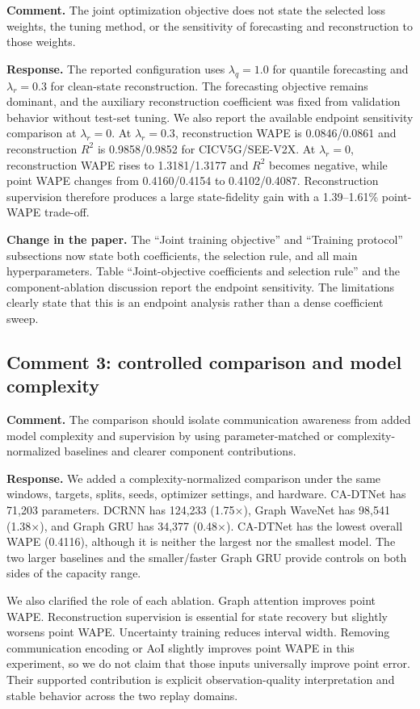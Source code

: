 \documentclass[11pt]{article}
\newcommand{\reviewcomment}[1]{\par\textcolor{commentblue}{\textbf{Comment.} #1}\par}
\newcommand{\authorresponse}[1]{\par\textcolor{responsegreen}{\textbf{Response.} #1}\par}
\newcommand{\paperchange}[1]{\par\textbf{Change in the paper.} #1\par}
\begin{document}
\reviewcomment{The joint optimization objective does not state the selected loss weights, the tuning method, or the sensitivity of forecasting and reconstruction to those weights.}

\authorresponse{The reported configuration uses $\lambda_q=1.0$ for quantile forecasting and $\lambda_r=0.3$ for clean-state reconstruction. The forecasting objective remains dominant, and the auxiliary reconstruction coefficient was fixed from validation behavior without test-set tuning. We also report the available endpoint sensitivity comparison at $\lambda_r=0$. At $\lambda_r=0.3$, reconstruction WAPE is 0.0846/0.0861 and reconstruction $R^2$ is 0.9858/0.9852 for CICV5G/SEE-V2X. At $\lambda_r=0$, reconstruction WAPE rises to 1.3181/1.3177 and $R^2$ becomes negative, while point WAPE changes from 0.4160/0.4154 to 0.4102/0.4087. Reconstruction supervision therefore produces a large state-fidelity gain with a 1.39--1.61\% point-WAPE trade-off.}

\paperchange{The ``Joint training objective'' and ``Training protocol'' subsections now state both coefficients, the selection rule, and all main hyperparameters. Table ``Joint-objective coefficients and selection rule'' and the component-ablation discussion report the endpoint sensitivity. The limitations clearly state that this is an endpoint analysis rather than a dense coefficient sweep.}

\subsection*{Comment 3: controlled comparison and model complexity}

\reviewcomment{The comparison should isolate communication awareness from added model complexity and supervision by using parameter-matched or complexity-normalized baselines and clearer component contributions.}

\authorresponse{We added a complexity-normalized comparison under the same windows, targets, splits, seeds, optimizer settings, and hardware. CA-DTNet has 71,203 parameters. DCRNN has 124,233 (1.75$\times$), Graph WaveNet has 98,541 (1.38$\times$), and Graph GRU has 34,377 (0.48$\times$). CA-DTNet has the lowest overall WAPE (0.4116), although it is neither the largest nor the smallest model. The two larger baselines and the smaller/faster Graph GRU provide controls on both sides of the capacity range.}

We also clarified the role of each ablation. Graph attention improves point WAPE. Reconstruction supervision is essential for state recovery but slightly worsens point WAPE. Uncertainty training reduces interval width. Removing communication encoding or AoI slightly improves point WAPE in this experiment, so we do not claim that those inputs universally improve point error. Their supported contribution is explicit observation-quality interpretation and stable behavior across the two replay domains.
\end{document}
